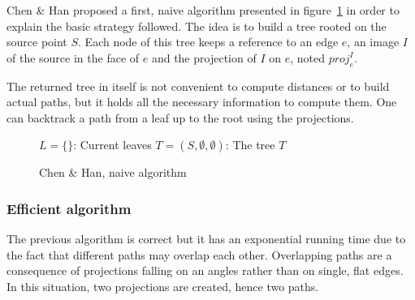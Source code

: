 Chen \& Han \cite{chen-han} proposed a first, naive algorithm presented in figure~\ref{fig:naiveChenHan} in order to explain the basic strategy followed. The idea is to build a tree rooted on the source point $S$. Each node of this tree keeps a reference to an edge $e$, an image $I$ of the source in the face of $e$ and the projection of $I$ on $e$, noted $proj^I_e$.\par
The returned tree in itself is not convenient to compute distances or to build actual paths, but it holds all the necessary information to compute them. One can backtrack a path from a leaf up to the root using the projections.

\begin{figure}[h]\centering
  \begin{algorithm}[H]
    \DontPrintSemicolon
    $L = \{\}$: Current leaves\;
    $T = (S, \emptyset, \emptyset)$: The tree\;
    \Return $T$\;
  \end{algorithm}
  \caption{Chen \& Han, naive algorithm}
  \label{fig:naiveChenHan}
\end{figure}

\subsubsection{Efficient algorithm}

The previous algorithm is correct but it has an exponential running time due to the fact that different paths may overlap each other. Overlapping paths are a consequence of projections falling on an angles rather than on single, flat edges. In this situation, two projections are created, hence two paths.\par

